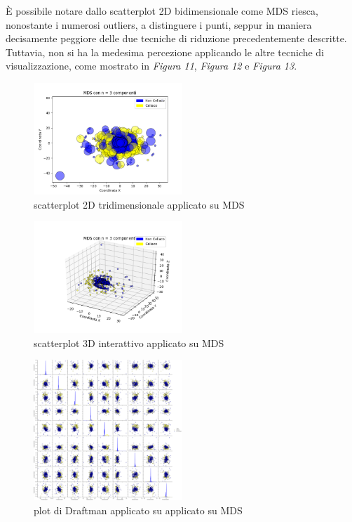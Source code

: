 \documentclass[11pt,a4paper,twocolumn]{article}
\begin{document}
	È possibile notare dallo scatterplot 2D bidimensionale come MDS riesca, nonostante i numerosi outliers, a distinguere i punti, seppur in maniera decisamente peggiore delle due tecniche di riduzione precedentemente descritte. Tuttavia, non si ha la medesima percezione applicando le altre tecniche di visualizzazione, come mostrato in \emph{Figura 11}, \emph{Figura 12} e \emph{Figura 13}.
	
	\begin{figure}[H]
		\centering
		\includegraphics[width=0.5\textwidth]{img/MDS_2Dnc3.png}
		\caption{scatterplot 2D tridimensionale applicato su MDS}
	\end{figure}
	
	\begin{figure}[H]
		\centering
		\includegraphics[width=0.5\textwidth]{img/MDS_i3D.png}
		\caption{scatterplot 3D interattivo applicato su MDS}
	\end{figure}
	
	\begin{figure}[H]
		\centering
		\includegraphics[width=0.5\textwidth]{img/MDS_SPLOM.png}
		\caption{plot di Draftman applicato su applicato su MDS}
	\end{figure}
\end{document}
